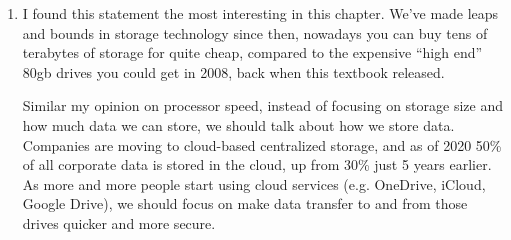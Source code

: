 \documentclass[11pt]{article}
\begin{document}
\begin{enumerate}
\item I found this statement the most interesting in this chapter. We've made leaps
and bounds in storage technology since then, nowadays you can buy tens of
terabytes of storage for quite cheap, compared to the expensive ``high end''
80gb drives you could get in 2008, back when this textbook
released.

Similar my opinion on processor speed, instead of focusing on storage size
and how much data we can store, we should talk about how we store data.
Companies are moving to cloud-based centralized storage, and as of 2020 50\%
of all corporate data is stored in the cloud, up from 30\% just 5 years
earlier. As more and more people start using cloud services (e.g. OneDrive,
iCloud, Google Drive), we should focus on make data transfer to and from
those drives quicker and more secure.
\end{enumerate}
\end{document}
